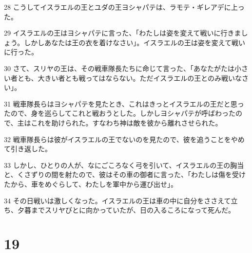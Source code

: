 \par 28 こうしてイスラエルの王とユダの王ヨシャパテは、ラモテ・ギレアデに上った。
\par 29 イスラエルの王はヨシャパテに言った、「わたしは姿を変えて戦いに行きましょう。しかしあなたは王の衣を着けなさい」。イスラエルの王は姿を変えて戦いに行った。
\par 30 さて、スリヤの王は、その戦車隊長たちに命じて言った、「あなたがたは小さい者とも、大きい者とも戦ってはならない。ただイスラエルの王とのみ戦いなさい」。
\par 31 戦車隊長らはヨシャパテを見たとき、これはきっとイスラエルの王だと思ったので、身を巡らしてこれと戦おうとした。しかしヨシャパテが呼ばわったので、主はこれを助けられた。すなわち神は敵を彼から離れさせられた。
\par 32 戦車隊長らは彼がイスラエルの王でないのを見たので、彼を追うことをやめて引き返した。
\par 33 しかし、ひとりの人が、なにごころなく弓を引いて、イスラエルの王の胸当と、くさずりの間を射たので、彼はその車の御者に言った、「わたしは傷を受けたから、車をめぐらして、わたしを軍中から運び出せ」。
\par 34 その日戦いは激しくなった。イスラエルの王は車の中に自分をささえて立ち、夕暮までスリヤびとに向かっていたが、日の入るころになって死んだ。

\chapter{19}

